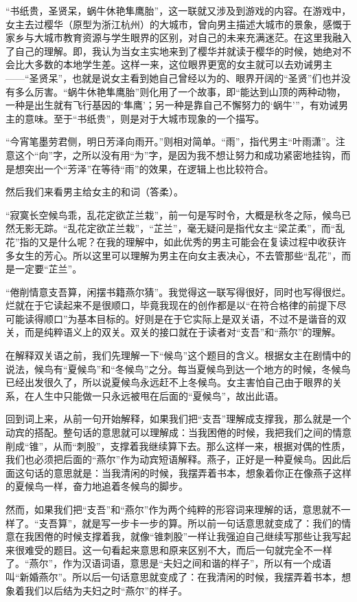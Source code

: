 \documentclass[a5paper]{ctexart}
\begin{document}
\begin{small}
		“书纸贵，圣贤呆，蜗牛休艳隼鹰胎”，这一联就又涉及到游戏的内容。在游戏中，女主去过樱华（原型为浙江杭州）的大城市，曾向男主描述大城市的景象，感慨于家乡与大城市教育资源与学生眼界的区别，对自己的未来充满迷茫。在这里我融入了自己的理解。即，我认为当女主实地来到了樱华并就读于樱华的时候，她绝对不会比大多数的本地学生差。这样一来，这位眼界更宽的女主就可以去劝诫男主——“圣贤呆”，也就是说女主看到她自己曾经以为的、眼界开阔的“圣贤”们也并没有多么厉害。“蜗牛休艳隼鹰胎”则化用了一个故事，即“能达到山顶的两种动物，一种是出生就有飞行基因的‘隼鹰’；另一种是靠自己不懈努力的‘蜗牛’”，有劝诫男主的意味。至于“书纸贵”，则是对于大城市现象的一个描写。
		
		“今宵笔墨劳君侧，明日芳泽向雨开。”则相对简单。“雨”，指代男主“叶雨潇”。注意这个“向”字，之所以没有用“为”字，是因为我不想让努力和成功紧密地挂钩，而是想突出一个“芳泽”在等待“雨”的效果，在逻辑上也比较符合。
		
		然后我们来看男主给女主的和词（答柔）。
		
		“寂寞长空候鸟乖，乱花定欲芷兰栽”，前一句是写时令，大概是秋冬之际，候鸟已然无影无踪。“乱花定欲芷兰栽”，“芷兰”，毫无疑问是指代女主“梁芷柔”，而“乱花”指的又是什么呢？在我的理解中，如此优秀的男主可能会在复读过程中收获许多女生的芳心。所以这里可以理解为男主在向女主表决心，不去管那些“乱花”，而是一定要“芷兰”。
		
		“倦削情意支吾算，闲摆书籍燕尔猜”。我觉得这一联写得很好，同时也写得很烂。烂就在于它读起来不是很顺口，毕竟我现在的创作都是以“在符合格律的前提下尽可能读得顺口”为基本目标的。好则是在于它实际上是双关语，不过不是谐音的双关，而是纯粹语义上的双关。双关的接口就在于读者对“支吾”和“燕尔”的理解。
		
		在解释双关语之前，我们先理解一下“候鸟”这个题目的含义。根据女主在剧情中的说法，候鸟有“夏候鸟”和“冬候鸟”之分。每当夏候鸟到达一个地方的时候，冬候鸟已经出发很久了，所以说夏候鸟永远赶不上冬候鸟。女主害怕自己由于眼界的关系，在人生中只能做一只永远被甩在后面的“夏候鸟”，故出此语。
		
		回到词上来，从前一句开始解释，如果我们把“支吾”理解成支撑我，那么就是一个动宾的搭配。整句话的意思就可以理解成：当我困倦的时候，我把我们之间的情意削成“锥”，从而“刺股”，支撑着我继续算下去。那么这样一来，根据对偶的性质，我们也必须把后面的“燕尔”作为动宾短语解释。燕子，正好是一种夏候鸟。因此后面这句话的意思就是：当我清闲的时候，我摆弄着书本，想象着你正在像燕子这样的夏候鸟一样，奋力地追着冬候鸟的脚步。
		
		然而，如果我们把“支吾”和“燕尔”作为两个纯粹的形容词来理解的话，意思就不一样了。“支吾算”，就是写一步卡一步的算。所以前一句话意思就变成了：我们的情意在我困倦的时候支撑着我，就像“锥刺股”一样让我强迫自己继续写那些让我写起来很难受的题目。这一句看起来意思和原来区别不大，而后一句就完全不一样了。“燕尔”，作为汉语词语，意思是“夫妇之间和谐的样子”，所以有一个成语叫“新婚燕尔”。所以后一句话意思就变成了：在我清闲的时候，我摆弄着书本，想象着我们以后结为夫妇之时“燕尔”的样子。
		

\end{small}
\end{document}
